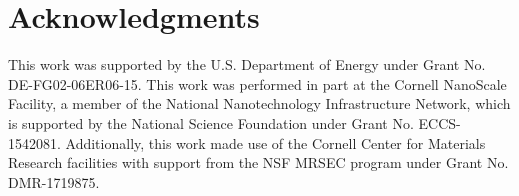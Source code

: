 \section{Acknowledgments}
This work was supported by the U.S. Department of Energy under Grant No. DE-FG02-06ER06-15. This work was performed in part at the Cornell NanoScale Facility, a member of the National Nanotechnology Infrastructure Network, which is supported by the National Science Foundation under Grant No. ECCS-1542081. Additionally, this work made use of the Cornell Center for Materials Research facilities with support from the NSF MRSEC program under Grant No. DMR-1719875.
